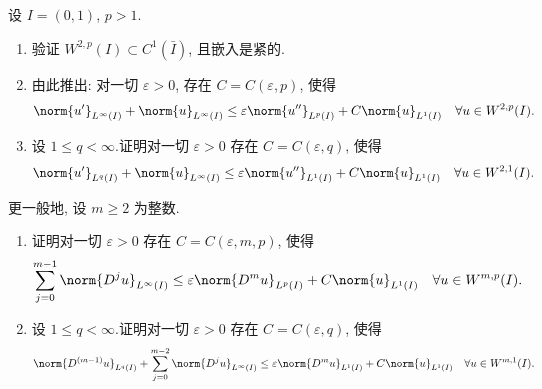 \begin{exercise}
\label{exer:8.6}
设 $I=(0,1)$, $p>1$.
\begin{enumerate}[label=\arabic*., leftmargin=2.2em, itemsep=0.3em]
	\item 验证 $W^{2,p}(I)\subset C^1(\bar I)$, 且嵌入是紧的.
	\item 由此推出: 对一切 $\varepsilon>0$, 存在 $C=C(\varepsilon,p)$, 使得
	      \begin{equation*}
	      \norm{u'}_{L^\infty(I)}+\norm{u}_{L^\infty(I)}
	      \le\varepsilon\norm{u''}_{L^p(I)}+C\norm{u}_{L^1(I)}
	      \quad\forall u\in W^{2,p}(I).
	      \end{equation*}
	\item 设 $1\le q<\infty$.证明对一切 $\varepsilon>0$ 存在
	      $C=C(\varepsilon,q)$, 使得
	      \begin{equation*}
	      \norm{u'}_{L^q(I)}+\norm{u}_{L^\infty(I)}
	      \le\varepsilon\norm{u''}_{L^1(I)}+C\norm{u}_{L^1(I)}
	      \quad\forall u\in W^{2,1}(I).
	      \end{equation*}
\end{enumerate}
更一般地, 设 $m\ge2$ 为整数.
\begin{enumerate}[label=\arabic*., leftmargin=2.2em, itemsep=0.3em, start=4]
	\item 证明对一切 $\varepsilon>0$ 存在 $C=C(\varepsilon,m,p)$, 使得
	      \begin{equation*}
	      \sum_{j=0}^{m-1}\norm{D^ju}_{L^\infty(I)}
	      \le\varepsilon\norm{D^mu}_{L^p(I)}+C\norm{u}_{L^1(I)}
	      \quad\forall u\in W^{m,p}(I).
	      \end{equation*}
	\item 设 $1\le q<\infty$.证明对一切 $\varepsilon>0$ 存在
	      $C=C(\varepsilon,q)$, 使得
	      \begin{equation*}
	      \norm{D^{(m-1)}u}_{L^q(I)}
	      +\sum_{j=0}^{m-2}\norm{D^ju}_{L^\infty(I)}
	      \le\varepsilon\norm{D^mu}_{L^1(I)}+C\norm{u}_{L^1(I)}
	      \quad\forall u\in W^{m,1}(I).
	      \end{equation*}
\end{enumerate}
\end{exercise}

